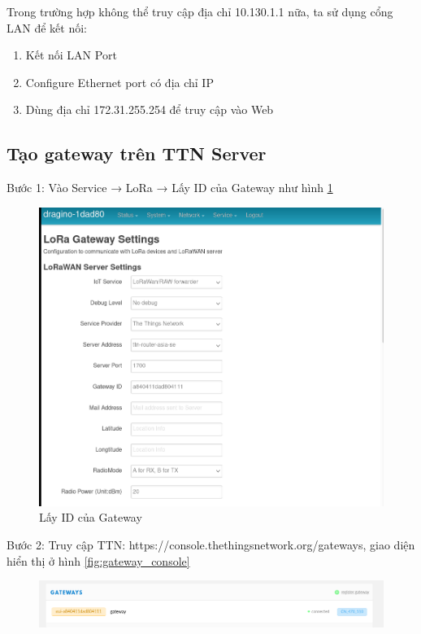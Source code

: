 Trong trường hợp không thể truy cập địa chỉ 10.130.1.1 nữa, ta sử dụng cổng LAN để kết nối:
\begin{enumerate}
    \item Kết nối LAN Port
    \item Configure Ethernet port có địa chỉ IP 
    \item Dùng địa chỉ 172.31.255.254 để truy cập vào Web
\end{enumerate}



\subsection{Tạo gateway trên TTN Server}
\begin{description}
    \item Bước 1: Vào Service → LoRa → Lấy ID của Gateway như hình \ref{fig:get_gateway_id}
    \begin{figure}[H]
        \centering
        \includegraphics[width=\textwidth]{images/Quanh/Gateway_ID.png}
        \caption{Lấy ID của Gateway}
        \label{fig:get_gateway_id}
    \end{figure}
    \item Bước 2: Truy cập TTN: https://console.thethingsnetwork.org/gateways, giao diện hiển thị ở hình \ref{fig:gateway_console}
    \begin{figure}[H]
        \centering
        \includegraphics[width=\textwidth]{images/Quanh/Gateway_console.png}

\end{figure}
\end{description}
